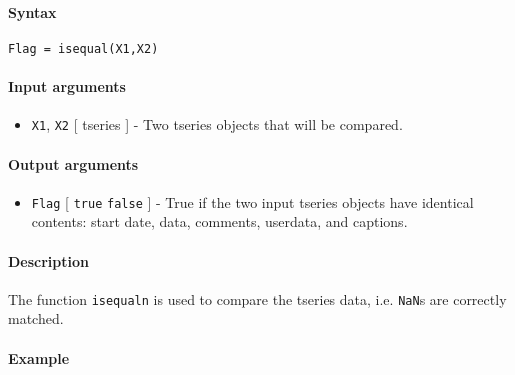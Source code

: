 


	\paragraph{Syntax}\label{syntax}

\begin{verbatim}
Flag = isequal(X1,X2)
\end{verbatim}

\paragraph{Input arguments}\label{input-arguments}

\begin{itemize}
\itemsep1pt\parskip0pt
\item
  \texttt{X1}, \texttt{X2} {[} tseries {]} - Two tseries objects that
  will be compared.
\end{itemize}

\paragraph{Output arguments}\label{output-arguments}

\begin{itemize}
\itemsep1pt\parskip0pt
\item
  \texttt{Flag} {[} \texttt{true} \textbar{} \texttt{false} {]} - True
  if the two input tseries objects have identical contents: start date,
  data, comments, userdata, and captions.
\end{itemize}

\paragraph{Description}\label{description}

The function \texttt{isequaln} is used to compare the tseries data, i.e.
\texttt{NaN}s are correctly matched.

\paragraph{Example}\label{example}


